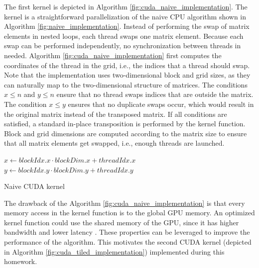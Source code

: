\documentclass[conference]{IEEEtran}
\begin{document}
    The first kernel is depicted in Algorithm \ref{fig:cuda_naive_implementation}. The kernel is a straightforward parallelization of the naive CPU algorithm shown in Algorithm \ref{fig:naive_implementation}. Instead of performing the swap of matrix elements in nested loops, each thread swaps one matrix element. Because each swap can be performed independently, no synchronization between threads in needed. Algorithm \ref{fig:cuda_naive_implementation} first computes the coordinates of the thread in the grid, i.e., the indices that a thread should swap. Note that the implementation uses two-dimensional block and grid sizes, as they can naturally map to the two-dimensional structure of matrices. The conditions $x \le n$ and $y \le n$ ensure that no thread swaps indices that are outside the matrix. The condition $x \le y$ ensures that no duplicate swaps occur, which would result in the original matrix instead of the transposed matrix. If all conditions are satisfied, a standard in-place transposition is performed by the kernel function. Block and grid dimensions are computed according to the matrix size to ensure that all matrix elements get swapped, i.e., enough threads are launched. 
    \begin{algorithm}
        \BlankLine
        $x \gets blockIdx.x \cdot blockDim.x + threadIdx.x$\;
        $y \gets blockIdx.y \cdot blockDim.y + threadIdx.y$\;
    
        \caption{Naive CUDA kernel}
        \label{fig:cuda_naive_implementation}        
    \end{algorithm}
    The drawback of the Algorithm \ref{fig:cuda_naive_implementation} is that every memory access in the kernel function is to the global GPU memory. An optimized kernel function could use the shared memory of the GPU, since it has higher bandwidth and lower latency \cite[See Section \emph{9.2.3. Shared Memory}]{cudadocs}. These properties can be leveraged to improve the performance of the algorithm. This motivates the second CUDA kernel (depicted in Algorithm \ref{fig:cuda_tiled_implementation}) implemented during this homework. 
\end{document}
